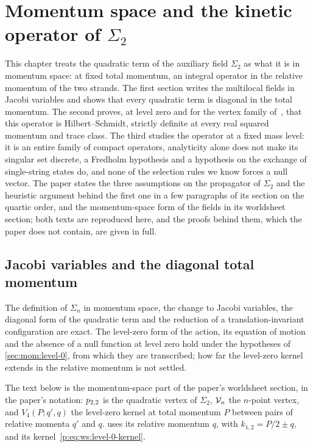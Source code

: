 \section{Momentum space and the kinetic operator of $\Sigma_2$}
\label{ch:momentum-space}

This chapter treats the quadratic term of the auxiliary field $\Sigma_2$ as what it is in momentum space: at fixed total momentum, an integral operator in the relative momentum of the two strands.
The first section writes the multilocal fields in Jacobi variables and shows that every quadratic term is diagonal in the total momentum.
The second proves, at level zero and for the vertex family of~\cite{Erbin:2026:SL2CVerticesClosed}, that this operator is Hilbert--Schmidt, strictly definite at every real squared momentum and trace class.
The third studies the operator at a fixed mass level: it is an entire family of compact operators, analyticity alone does not make its singular set discrete, a Fredholm hypothesis and a hypothesis on the exchange of single-string states do, and none of the selection rules we know forces a null vector.
The paper states the three assumptions on the propagator of $\Sigma_2$ and the heuristic argument behind the first one in a few paragraphs of its section on the quartic order, and the momentum-space form of the fields in its worldsheet section; both texts are reproduced here, and the proofs behind them, which the paper does not contain, are given in full.

\subsection{Jacobi variables and the diagonal total momentum}
\label{sec:mom:jacobi}


The definition of $\Sigma_n$ in momentum space, the change to Jacobi variables, the diagonal form of the quadratic term and the reduction of a translation-invariant configuration are exact.
The level-zero form of the action, its equation of motion and the absence of a null function at level zero hold under the hypotheses of \cref{sec:mom:level-0}, from which they are transcribed; how far the level-zero kernel extends in the relative momentum is not settled.

The text below is the momentum-space part of the paper's worldsheet section, in the paper's notation: $p_{2,2}$ is the quadratic vertex of $\Sigma_2$, $\mathcal{V}_{n}$ the $n$-point vertex, and $V_4(P; q', q)$ the level-zero kernel at total momentum $P$ between pairs of relative momenta $q'$ and $q$.
 uses its relative momentum $q$, with $k_{1, 2} = P / 2 \pm q$, and its kernel~\eqref{p:eq:ws:level-0-kernel}.

